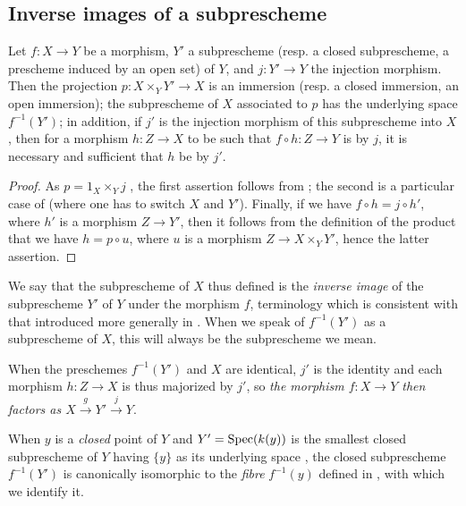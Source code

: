 \subsection{Inverse images of a subprescheme}
\label{subsection-inverse-image-of-subprescheme}

\begin{prop}[4.4.1]
\label{1.4.4.1}
Let $f:X\to Y$ be a morphism, $Y'$ a subprescheme (resp. a closed subprescheme, a prescheme induced by an open set) of $Y$, and $j:Y'\to Y$ the injection morphism.
Then the projection $p:X\times_Y Y'\to X$ is an immersion (resp. a closed immersion, an open immersion); the subprescheme of $X$ associated to $p$ has the underlying space $f^{-1}(Y')$; in addition, if $j'$ is the injection morphism of this subprescheme into $X$, then for a morphism $h:Z\to X$ to be such that $f\circ h:Z\to Y$ is  by $j$, it is necessary and sufficient that $h$ be  by $j'$.
\end{prop}

\begin{proof}
\label{proof-1.4.4.1}
As $p=1_X\times_Y j$ , the first assertion follows from ; the second is a particular case of  (where one has to switch $X$ and $Y'$).
Finally, if we have $f\circ h=j\circ h'$, where $h'$ is a morphism $Z\to Y'$, then it follows from the definition of the product that we have $h=p\circ u$, where $u$ is a morphism $Z\to X\times_Y Y'$, hence the latter assertion.
\end{proof}

We say that the subprescheme of $X$ thus defined is the \emph{inverse image} of the subprescheme $Y'$ of $Y$ under the morphism $f$, terminology which is consistent with that introduced
more generally in .
When we speak of $f^{-1}(Y')$ as a subprescheme of $X$, this will always be the subprescheme we mean.

When the preschemes $f^{-1}(Y')$ and $X$ are identical, $j'$ is the identity and each morphism $h:Z\to X$ is thus majorized by $j'$, so \emph{the morphism $f:X\to Y$ then factors as $X\xrightarrow{g}Y'\xrightarrow{j}Y$}.

When $y$ is a \emph{closed} point of $Y$ and $Y'={\mathop{\mathrm{Spec}}\nolimits}(k(y))$ is the smallest closed subprescheme of $Y$ having $\{y\}$ as its underlying space , the closed subprescheme $f^{-1}(Y')$ is canonically isomorphic to the \emph{fibre} $f^{-1}(y)$ defined in , with which we identify it.

